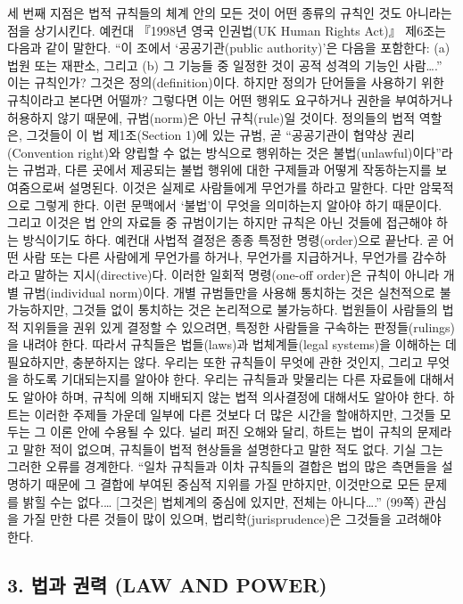 세 번째 지점은 법적 규칙들의 체계 안의 모든 것이 어떤 종류의 규칙인 것도
아니라는 점을 상기시킨다. 예컨대 『1998년 영국 인권법(UK Human Rights
Act)』 제6조는 다음과 같이 말한다. “이 조에서 ‘공공기관(public
authority)’은 다음을 포함한다: (a) 법원 또는 재판소, 그리고 (b) 그
기능들 중 일정한 것이 공적 성격의 기능인 사람\ldots.” 이는 규칙인가?
그것은 정의(definition)이다. 하지만 정의가 단어들을 사용하기 위한
규칙이라고 본다면 어떨까? 그렇다면 이는 어떤 행위도 요구하거나 권한을
부여하거나 허용하지 않기 때문에, 규범(norm)은 아닌 규칙(rule)일 것이다.
정의들의 법적 역할은, 그것들이 이 법 제1조(Section 1)에 있는 규범, 곧
“공공기관이 협약상 권리(Convention right)와 양립할 수 없는 방식으로
행위하는 것은 불법(unlawful)이다”라는 규범과, 다른 곳에서 제공되는 불법
행위에 대한 구제들과  어떻게 작동하는지를
보여줌으로써 설명된다. 이것은 실제로 사람들에게 무언가를 하라고 말한다.
다만 암묵적으로 그렇게 한다. 이런 문맥에서 ‘불법’이 무엇을 의미하는지
알아야 하기 때문이다. 그리고 이것은 법 안의 자료들 중 규범이기는 하지만
규칙은 아닌 것들에 접근해야 하는 방식이기도 하다. 예컨대 사법적 결정은
종종 특정한 명령(order)으로 끝난다. 곧 어떤 사람 또는 다른 사람에게
무언가를 하거나, 무언가를 지급하거나, 무언가를 감수하라고 말하는
지시(directive)다. 이러한 일회적 명령(one-off order)은 규칙이 아니라
개별 규범(individual norm)이다. 개별 규범들만을 사용해 통치하는 것은
실천적으로 불가능하지만, 그것들 없이 통치하는 것은 논리적으로
불가능하다. 법원들이 사람들의 법적 지위들을 권위 있게 결정할 수
있으려면, 특정한 사람들을 구속하는 판정들(rulings)을 내려야 한다. 따라서
규칙들은 법들(laws)과 법체계들(legal systems)을 이해하는 데 필요하지만,
충분하지는 않다. 우리는 또한 규칙들이 무엇에 관한 것인지, 그리고 무엇을
하도록 기대되는지를 알아야 한다. 우리는 규칙들과 맞물리는 다른 자료들에
대해서도 알아야 하며, 규칙에 의해 지배되지 않는 법적 의사결정에 대해서도
알아야 한다. 하트는 이러한 주제들 가운데 일부에 다른 것보다 더 많은
시간을 할애하지만, 그것들 모두는 그 이론 안에 수용될 수 있다. 널리 퍼진
오해와 달리, 하트는 법이  규칙의 문제라고 말한 적이 없으며,
규칙들이  법적 현상들을 설명한다고 말한 적도 없다. 기실 그는
그러한 오류를 경계한다. “일차 규칙들과 이차 규칙들의 결합은 법의 많은
측면들을 설명하기 때문에 그 결합에 부여된 중심적 지위를 가질 만하지만,
이것만으로 모든 문제를 밝힐 수는 없다.\ldots{} {[}그것은{]} 법체계의
중심에 있지만, 전체는 아니다\ldots.” (99쪽) 관심을 가질 만한 다른
것들이 많이 있으며, 법리학(jurisprudence)은 그것들을 고려해야 한다.

\subsection{3. 법과 권력 (LAW AND
POWER)}\label{uxbc95uxacfc-uxad8cuxb825-law-and-power}

